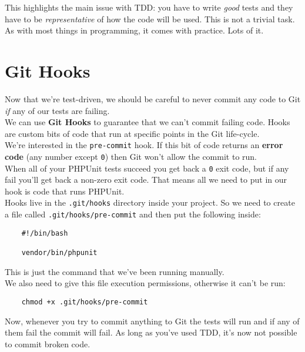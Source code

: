 This highlights the main issue with TDD: you have to write \textit{good} tests and they have to be \textit{representative} of how the code will be used. This is not a trivial task. As with most things in programming, it comes with practice. Lots of it.



\section{Git Hooks}

Now that we're test-driven, we should be careful to never commit any code to Git \textit{if} any of our tests are failing.
\\

We can use \textbf{Git Hooks} to guarantee that we can't commit failing code. Hooks are custom bits of code that run at specific points in the Git life-cycle.
\\

We're interested in the \texttt{pre-commit} hook. If this bit of code returns an \textbf{error code} (any number except \texttt{0}) then Git won't allow the commit to run.
\\

When all of your PHPUnit tests succeed you get back a \texttt{0} exit code, but if any fail you'll get back a non-zero exit code. That means all we need to put in our hook is code that runs PHPUnit.
\\

Hooks live in the \texttt{.git/hooks} directory inside your project. So we need to create a file called \texttt{.git/hooks/pre-commit} and then put the following inside:

\begin{verbatim}
    #!/bin/bash

    vendor/bin/phpunit
\end{verbatim}

This is just the command that we've been running manually.
\\

We also need to give this file execution permissions, otherwise it can't be run:

\begin{verbatim}
    chmod +x .git/hooks/pre-commit
\end{verbatim}

Now, whenever you try to commit anything to Git the tests will run and if any of them fail the commit will fail. As long as you've used TDD, it's now not possible to commit broken code.

